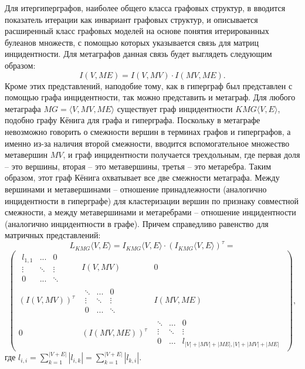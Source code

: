 Для итергиперграфов, наиболее общего класса графовых структур, в \cite{BluminIterGG} вводится показатель итерации как инвариант графовых структур, и описывается расширенный класс графовых моделей на основе понятия итерированных булеанов множеств, с помощью которых указывается связь для матриц инцидентности. Для метаграфов данная связь будет выглядеть следующим образом: 
\begin{equation} \label{eq:rel2}
I(V, ME) = I(V, MV) \cdot I(MV, ME).
\end{equation}
Кроме этих представлений, наподобие тому, как в \cite{JoslynN17} гиперграф был представлен с помощью графа инцидентности, так можно представить и метаграф. Для любого метаграфа $MG=\langle V, MV, ME \rangle$ существует граф инцидентности $KMG\langle V,E\rangle$, подобно графу Кёнига для графа и гиперграфа. Поскольку в метаграфе невозможно говорить о смежности вершин в терминах графов и гиперграфов, а именно из-за наличия второй смежности, вводится вспомогательное множество метавершин $MV$, и граф инцидентности получается трехдольным, где первая доля -- это вершины, вторая -- это метавершины, третья -- это метаребра. Таким образом, этот граф Кёнига охватывает все две смежности метаграфа. Между вершинами и метавершинами -- отношение принадлежности (аналогично инцидентности в гиперграфе) для кластеризации вершин по признаку совместной смежности, а между метавершинами и метаребрами -- отношение инцидентности (аналогично инцидентности в графе). Причем справедливо равенство для матричных представлений:
$$L_{KMG}\langle V,E \rangle = I_{KMG}\langle V,E \rangle \cdot (I_{KMG}\langle V,E \rangle)^\tau= $$
$$
\left(
\begin{array}{c|c|c}
 \begin{array}{ccc}
  l_{1,1} & ...& 0\\
  \vdots& \ddots &\vdots \\
  0&... & \ddots
 \end{array}
  & I(V, MV) & 0 \\
\hline
(I(V,MV))^\tau & \begin{array}{ccc}
  \ddots & ...& 0\\
  \vdots& \ddots &\vdots \\
  0&... & \ddots
 \end{array} & I(MV, ME) \\
\hline
0 & (I(MV,ME))^\tau & \begin{array}{ccc}
  \ddots & ...& 0\\
  \vdots& \ddots &\vdots \\
  0&... & l_{|V|+|MV|+|ME|,|V|+|MV|+|ME|}
 \end{array}
\end{array}
\right),$$ где $l_{i,i}=\sum\limits_{k=1}^{|V+E|}|l_{i,k}|=\sum\limits_{k=1}^{|V+E|}|l_{k,i}|.$



